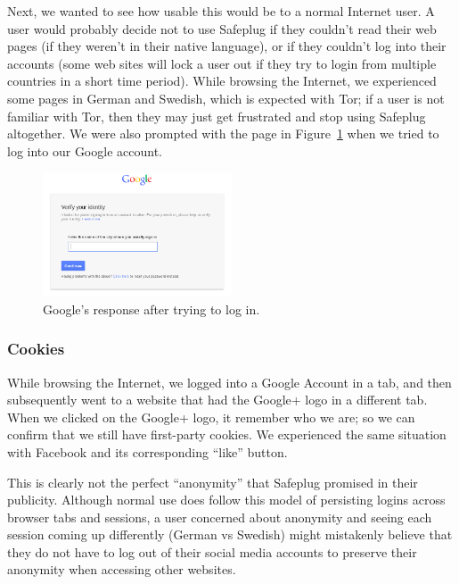 Next, we wanted to see how usable this would be to a normal Internet user.  A user would probably decide not to use Safeplug if they couldn't read their web pages (if they weren't in their native language), or if they couldn't log into their accounts (some web sites will lock a user out if they try to login from multiple countries in a short time period).  While browsing the Internet, we experienced some pages in German and Swedish, which is expected with Tor; if a user is not familiar with Tor, then they may just get frustrated and stop using Safeplug altogether.  We were also prompted with the page in Figure~\ref{fig:funnygoogle} when we tried to log into our Google account. 

\begin{figure}[htb]
\begin{center}
\includegraphics[width=0.5\textwidth]{funnygoogle}
\caption{Google's response after trying to log in.}
\label{fig:funnygoogle}
\end{center}
\end{figure}

\subsubsection{Cookies}  While browsing the Internet, we logged into a Google Account in a tab, and then subsequently went to a website that had the Google+ logo in a different tab.  When we clicked on the Google+ logo, it remember who we are; so we can confirm that we still have first-party cookies.  We experienced the same situation with Facebook and its corresponding ``like'' button.

This is clearly not the perfect ``anonymity'' that Safeplug promised in their publicity.  Although normal use does follow this model of persisting logins across browser tabs and sessions, a user concerned about anonymity and seeing each session coming up differently (German vs Swedish) might mistakenly believe that they do not have to log out of their social media accounts to preserve their anonymity when accessing other websites.

